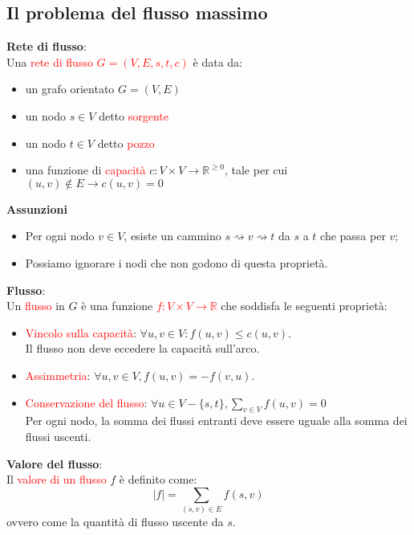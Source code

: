 \documentclass[../cheatSheetAlgoritmi.tex]{subfiles}
\begin{document}
\subsection{Il problema del flusso massimo}
\textbf{Rete di flusso}:\\
Una \textcolor{red}{rete di flusso $G = (V, E, s, t, c)$} è data da:
\begin{itemize}
	\item un grafo orientato $G = (V, E)$
	\item un nodo $s \in V$ detto \textcolor{red}{sorgente}
	\item un nodo $t \in V$ detto \textcolor{red}{pozzo}
	\item una funzione di \textcolor{red}{capacità} $c : V \times V \rightarrow \mathbb{R}^{\geq 0}$, tale per cui $(u, v) \notin E \rightarrow c(u, v) = 0$
\end{itemize}
\textbf{Assunzioni}
\begin{itemize}
	\item Per ogni nodo $v \in V$, esiste un cammino $s \rightsquigarrow v \rightsquigarrow t$ da $s$ a $t$ che passa per $v$;
	\item Possiamo ignorare i nodi che non godono di questa proprietà.
\end{itemize}
\textbf{Flusso}: \\
Un \textcolor{red}{flusso} in $G$ è una funzione \textcolor{red}{$f: V \times V \rightarrow \mathbb{R}$} che soddisfa le seguenti proprietà:
\begin{itemize}
	\item \textcolor{red}{Vincolo sulla capacità}: $\forall u, v \in V : f(u, v) \leq c(u,v)$.\\ Il flusso non deve eccedere la capacità sull'arco.
	\item \textcolor{red}{Assimmetria}: $\forall u, v \in V, f(u,v) = - f(v, u)$. 
	\item \textcolor{red}{Conservazione del flusso}: $\forall u \in V - \{s, t\}, \sum_{v \in V} f(u, v) = 0$ 	\\
	Per ogni nodo, la somma dei flussi entranti deve essere uguale alla somma dei flussi uscenti.
\end{itemize}
\textbf{Valore del flusso}:\\
Il \textcolor{red}{valore di un flusso} $f$ è definito come: 
\begin{equation*}
  	|f| = \sum_{(s, v) \in E} f(s, v)
\end{equation*}
ovvero come la quantità di flusso uscente da $s$.
\newpage
\end{document}
